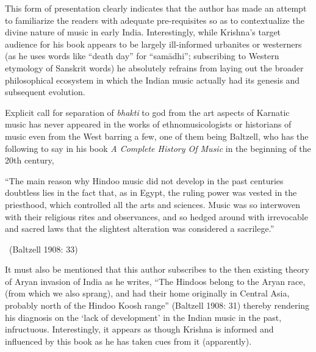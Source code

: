This form of presentation clearly indicates that the author has made an attempt to familiarize the readers with adequate pre-requisites so as to contextualize the divine nature of music in early India. Interestingly, while Krishna’s target audience for his book appears to be largely ill-informed urbanites or westerners (as he uses words like “death day” for “samādhi”; subscribing to Western etymology of Sanskrit words) he absolutely refrains from laying out the broader philosophical ecosystem in which the Indian music actually had its genesis and subsequent evolution.

Explicit call for separation of \textit{bhakti} to god from the art aspects of Karnatic music has never appeared in the works of ethnomusicologists or historians of music even from the West barring a few, one of them being Baltzell, who has the following to say in his book \textit{A Complete History Of Music} in the beginning of the 20th century,

\vspace{.1cm}

\begin{myquote}
“The main reason why Hindoo music did not develop in the past centuries doubtless lies in the fact that, as in Egypt, the ruling power was vested in the priesthood, which controlled all the arts and sciences. Music was so interwoven with their religious rites and observances, and so hedged around with irrevocable and sacred laws that the slightest alteration was considered a sacrilege.” 

\vspace{-.2cm}

~\hfill (Baltzell 1908: 33)
\end{myquote}


It must also be mentioned that this author subscribes to the then existing theory of Aryan invasion of India as he writes, “The Hindoos belong to the Aryan race, (from which we also sprang), and had their home originally in Central Asia, probably north of the Hindoo Koosh range” (Baltzell 1908: 31) thereby rendering his diagnosis on the ‘lack of development’ in the Indian music in the past, infructuous. Interestingly, it appears as though Krishna is informed and influenced by this book as he has taken cues from it (apparently).

